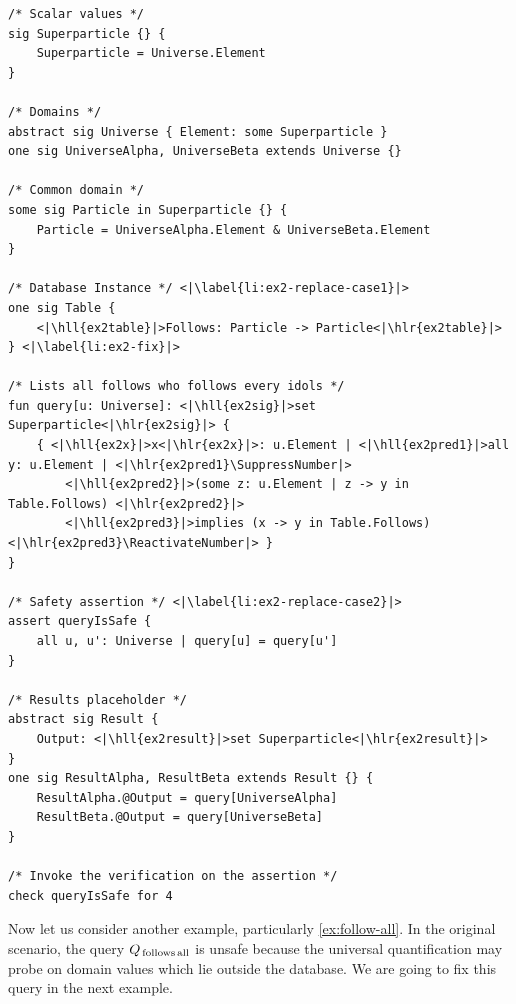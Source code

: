 \vspace*{3pc}
\begin{lstlisting}[language=alloy,basicstyle={\footnotesize\ttfamily},caption={The complete Alloy programw which verifies the query {\protect $Q_\text{\,follows\,all\,v2}$} as shown in \autoref{ex:major-ex2}. Alloy codes highlighted in yellow indicates portions of code which are translated according and depending on the original database schema and \textsc{drc} query. Also noted that, unlike \autoref{src:major-ex1}, this Alloy program does not require the \alloy{Constant} model.},label={src:major-ex2},aboveskip=0pc,belowskip=0pc]
/* Scalar values */
sig Superparticle {} {
	Superparticle = Universe.Element
}

/* Domains */
abstract sig Universe { Element: some Superparticle }
one sig UniverseAlpha, UniverseBeta extends Universe {}

/* Common domain */
some sig Particle in Superparticle {} {
	Particle = UniverseAlpha.Element & UniverseBeta.Element
}

/* Database Instance */ <|\label{li:ex2-replace-case1}|>
one sig Table {
    <|\hll{ex2table}|>Follows: Particle -> Particle<|\hlr{ex2table}|>
} <|\label{li:ex2-fix}|>

/* Lists all follows who follows every idols */
fun query[u: Universe]: <|\hll{ex2sig}|>set Superparticle<|\hlr{ex2sig}|> {
    { <|\hll{ex2x}|>x<|\hlr{ex2x}|>: u.Element | <|\hll{ex2pred1}|>all y: u.Element | <|\hlr{ex2pred1}\SuppressNumber|>
        <|\hll{ex2pred2}|>(some z: u.Element | z -> y in Table.Follows) <|\hlr{ex2pred2}|>
        <|\hll{ex2pred3}|>implies (x -> y in Table.Follows)<|\hlr{ex2pred3}\ReactivateNumber|> }
}

/* Safety assertion */ <|\label{li:ex2-replace-case2}|>
assert queryIsSafe {
    all u, u': Universe | query[u] = query[u']
}

/* Results placeholder */
abstract sig Result {
    Output: <|\hll{ex2result}|>set Superparticle<|\hlr{ex2result}|>
}
one sig ResultAlpha, ResultBeta extends Result {} {
    ResultAlpha.@Output = query[UniverseAlpha]
    ResultBeta.@Output = query[UniverseBeta]
}

/* Invoke the verification on the assertion */
check queryIsSafe for 4
\end{lstlisting}

\bigskip
Now let us consider another example, particularly \autoref{ex:follow-all}. In the original scenario, the query $Q_\text{\,follows\,all}$ is unsafe because the universal quantification may probe on domain values which lie outside the database. We are going to fix this query in the next example.

